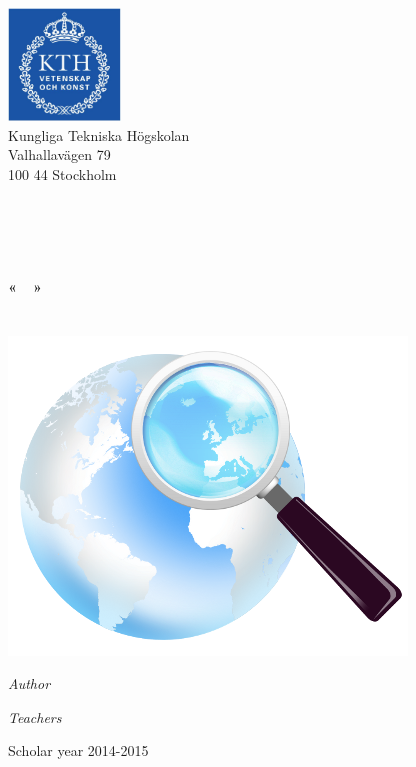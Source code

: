 \begin{center}
	\begin{minipage}[t]{0.48\textwidth}
	  \begin{flushleft}
	    \includegraphics [width=30mm]{img/logo_kth.jpg} \\[0.1cm]
		Kungliga Tekniska Högskolan\\
		Valhallavägen 79\\
		100 44 Stockholm
	  \end{flushleft}
	\end{minipage}
	\begin{minipage}[t]{0.48\textwidth}
	  \begin{flushright}
	  \end{flushright}
	\end{minipage} \\[1cm]

	\textsc{\Large \reportsubject}\\[0.3cm]
	\HRule \\[0.4cm]
	{\Huge \bfseries \reporttitle}\\[0.3cm]
	{\LARGE \bfseries «~\stagetopic~»}\\[0.3cm]
	{\Large \dateperiod}\\[0.4cm]
	\HRule \\[1.5cm]

	\includegraphics [width=0.4\linewidth]{img/icon.png} \\[1.5cm]
	\begin{minipage}[t]{0.5\textwidth}
	  \begin{flushleft} \large
	    \emph{Author}\\
	    \reportauthor
	  \end{flushleft}
	\end{minipage}
	\begin{minipage}[t]{0.4\textwidth}
	  \begin{flushright} \large
	    \emph{Teachers} \\
	    \enseignants
	  \end{flushright}
	\end{minipage}

	\vfill
	\footnotesize{Scholar year 2014-2015}
\end{center}

